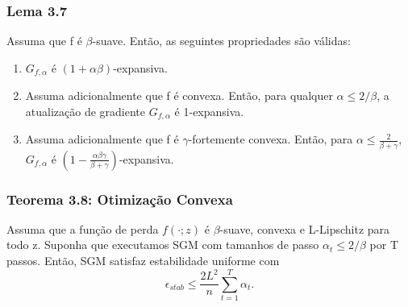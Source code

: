 \documentclass{beamer}
\begin{document}
\begin{frame}
\frametitle{Lema 3.7}
\begin{lemma}[3.7]
Assuma que f é \(\beta\)-suave. Então, as seguintes propriedades são válidas: 
\begin{enumerate}
    \item \(G_{f,\alpha}\) é \((1+\alpha\beta)\)-expansiva. 
    \item Assuma adicionalmente que f é convexa. Então, para qualquer \(\alpha \le 2/\beta\), a atualização de gradiente \(G_{f,\alpha}\) é 1-expansiva.
    \item Assuma adicionalmente que f é \(\gamma\)-fortemente convexa. Então, para \(\alpha \le \frac{2}{\beta+\gamma}\), \(G_{f,\alpha}\) é \(\left(1-\frac{\alpha\beta\gamma}{\beta+\gamma}\right)\)-expansiva.
\end{enumerate}
\end{lemma}
\end{frame}

\begin{frame}
\frametitle{Teorema 3.8: Otimização Convexa}
\begin{theorem}[3.8]
Assuma que a função de perda \(f(\cdot;z)\) é \(\beta\)-suave, convexa e L-Lipschitz para todo z.  Suponha que executamos SGM com tamanhos de passo \(\alpha_{t} \le 2/\beta\) por T passos. Então, SGM satisfaz estabilidade uniforme com
$$ \epsilon_{stab} \le \frac{2L^2}{n}\sum_{t=1}^{T}\alpha_{t}. $$ 
\end{theorem}
\end{frame}
\end{document}
